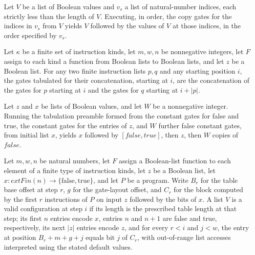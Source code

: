 \begin{theorem}
\label{BoolCircuit.runWith_copies}
\leanok
{}
Let $V$ be a list of Boolean values and $v_s$ a list of natural-number indices, each
strictly less than the length of $V$. Executing, in order, the copy gates for the
indices in $v_s$ from $V$ yields $V$ followed by the values of $V$ at those indices, in
the order specified by $v_s$.
\end{theorem}

\begin{theorem}
\label{BoolCircuit.tabProgGates_append}
\leanok
{}
Let $\kappa$ be a finite set of instruction kinds, let $m,w,n$ be nonnegative integers,
let $F$ assign to each kind a function from Boolean lists to Boolean lists, and let $z$
be a Boolean list. For any two finite instruction lists $p,q$ and any starting position
$i$, the gates tabulated for their concatenation, starting at $i$, are the concatenation
of the gates for $p$ starting at $i$ and the gates for $q$ starting at $i+|p|$.
\end{theorem}

\begin{theorem}
\label{BoolCircuit.runWith_tabPre}
\leanok
{}
Let $z$ and $x$ be lists of Boolean values, and let $W$ be a nonnegative integer.
Running the tabulation preamble formed from the constant gates for false and true, the
constant gates for the entries of $z$, and $W$ further false constant gates, from
initial list $x$, yields $x$ followed by $[false,true]$, then $z$, then $W$ copies of
$false$.
\end{theorem}

\begin{definition}
\label{BoolCircuit.TabInv}
\leanok
{}
Let $m,w,n$ be natural numbers, let $F$ assign a Boolean-list function to each element
of a finite type of instruction kinds, let $z$ be a Boolean list, let
$x:	ext{Fin}(n)\to\{\mathrm{false},\mathrm{true}\}$, and let $P$ be a program. Write
$B_r$ for the table base offset at step $r$, $g$ for the gate-layout offset, and $C_r$
for the block computed by the first $r$ instructions of $P$ on input $z$ followed by the
bits of $x$. A list $V$ is a valid configuration at step $i$ if its length is the
prescribed table length at that step; its first $n$ entries encode $x$, entries $n$ and
$n+1$ are false and true, respectively, its next $|z|$ entries encode $z$, and for every
$r<i$ and $j<w$, the entry at position $B_r+m+g+j$ equals bit $j$ of $C_r$, with
out-of-range list accesses interpreted using the stated default values.
\end{definition}

